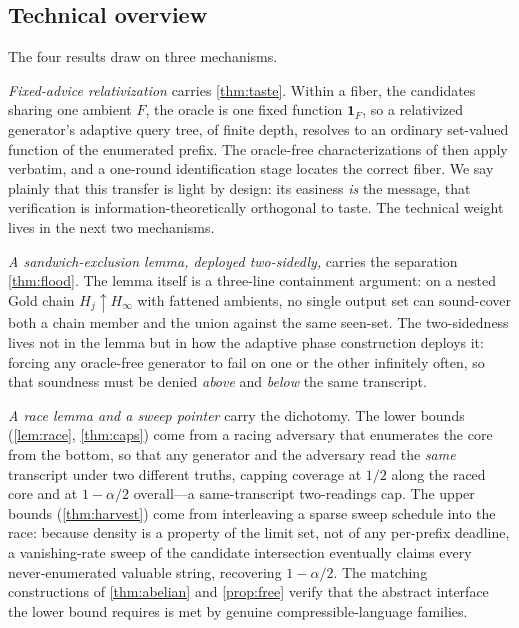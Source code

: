 \documentclass[11pt]{article}
\numberwithin{equation}{section}
\newcommand{\Amb}{F}
\newcommand{\Val}{H}
\theoremstyle{plain}
\theoremstyle{definition}
\theoremstyle{remark}
\begin{document}
\subsection{Technical overview}
\label{sec:intro-technique}

The four results draw on three mechanisms.

\emph{Fixed-advice relativization} carries \cref{thm:taste}. Within a fiber, the candidates
sharing one ambient $\Amb$, the oracle is one fixed function $\mathbf 1_{\Amb}$, so a
relativized generator's adaptive query tree, of finite depth, resolves to an ordinary
set-valued function of the enumerated prefix. The oracle-free characterizations of
\citet{kalavasis2024characterizations} then apply verbatim, and a one-round identification
stage locates the correct fiber. We say plainly that this transfer is light by design: its
easiness \emph{is} the message, that verification is information-theoretically orthogonal to
taste. The technical weight lives in the next two mechanisms.

\emph{A sandwich-exclusion lemma, deployed two-sidedly,} carries the separation
\cref{thm:flood}. The lemma itself is a three-line containment argument: on a nested Gold
chain $\Val_j\uparrow\Val_\infty$ with fattened ambients, no single output set can sound-cover
both a chain member and the union against the same seen-set. The two-sidedness lives not in
the lemma but in how the adaptive phase construction deploys it: forcing any oracle-free
generator to fail on one or the other infinitely often, so that soundness must be denied
\emph{above} and \emph{below} the same transcript.

\emph{A race lemma and a sweep pointer} carry the dichotomy. The lower bounds
(\cref{lem:race}, \cref{thm:caps}) come from a racing adversary that enumerates the core from
the bottom, so that any generator and the adversary read the \emph{same} transcript under two
different truths, capping coverage at $1/2$ along the raced core and at $1-\alpha/2$
overall---a same-transcript two-readings cap. The upper bounds (\cref{thm:harvest}) come from
interleaving a sparse sweep schedule into the race: because density is a property of the limit
set, not of any per-prefix deadline, a vanishing-rate sweep of the candidate intersection
eventually claims every never-enumerated valuable string, recovering $1-\alpha/2$. The
matching constructions of \cref{thm:abelian} and \cref{prop:free} verify that the abstract
interface the lower bound requires is met by genuine compressible-language families.
\end{document}
